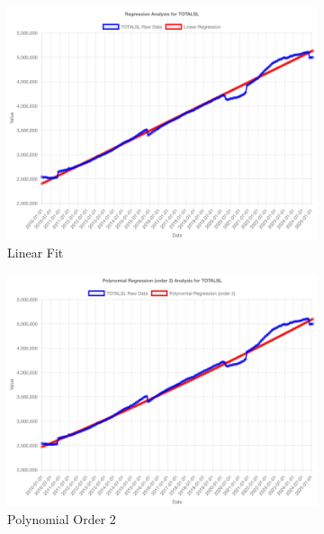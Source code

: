 \documentclass[11pt,a4paper]{article}
\begin{document}
\begin{figure}[htbp]
  \centering
  \begin{subfigure}[b]{0.32\textwidth}
    \includegraphics[width=\textwidth]{backend/analyses/TOTALSL_analysis.png}
    \caption{Linear Fit}
  \end{subfigure}
  \hfill
  \begin{subfigure}[b]{0.32\textwidth}
    \includegraphics[width=\textwidth]{backend/analyses/TOTALSL_poly_order_2_analysis.png}
    \caption{Polynomial Order 2}
  \end{subfigure}
  \hfill
  \begin{subfigure}[b]{0.32\textwidth}

\end{subfigure}
\end{figure}
\end{document}

